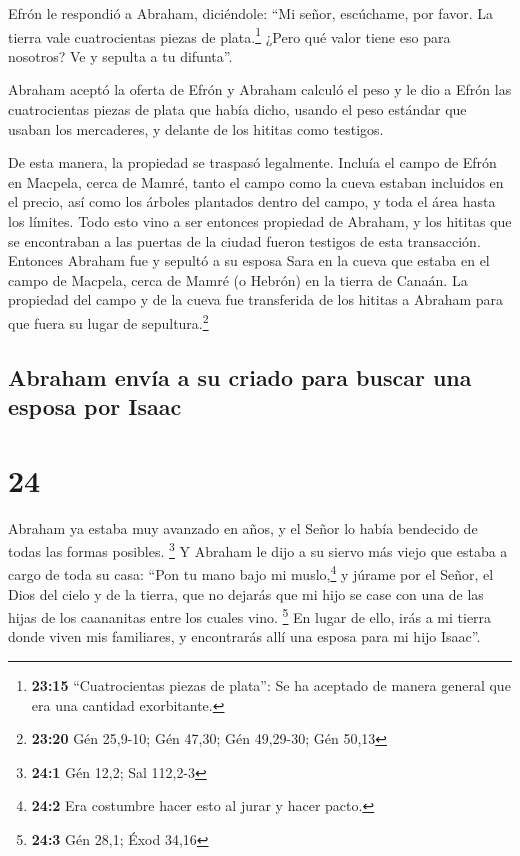  Efrón le respondió a Abraham, diciéndole:
 ``Mi señor, escúchame, por favor. La tierra vale
cuatrocientas piezas de plata.\footnote{\textbf{23:15} ``Cuatrocientas
  piezas de plata'': Se ha aceptado de manera general que era una
  cantidad exorbitante.} ¿Pero qué valor tiene eso para nosotros? Ve y
sepulta a tu difunta''.

 Abraham aceptó la oferta de Efrón y Abraham calculó el
peso y le dio a Efrón las cuatrocientas piezas de plata que había dicho,
usando el peso estándar que usaban los mercaderes, y delante de los
hititas como testigos.

 De esta manera, la propiedad se traspasó legalmente.
Incluía el campo de Efrón en Macpela, cerca de Mamré, tanto el campo
como la cueva estaban incluidos en el precio, así como los árboles
plantados dentro del campo, y toda el área hasta los límites.
 Todo esto vino a ser entonces propiedad de Abraham, y
los hititas que se encontraban a las puertas de la ciudad fueron
testigos de esta transacción.  Entonces Abraham fue y
sepultó a su esposa Sara en la cueva que estaba en el campo de Macpela,
cerca de Mamré (o Hebrón) en la tierra de Canaán.  La
propiedad del campo y de la cueva fue transferida de los hititas a
Abraham para que fuera su lugar de sepultura.\footnote{\textbf{23:20}
  Gén 25,9-10; Gén 47,30; Gén 49,29-30; Gén 50,13}

\hypertarget{abraham-envuxeda-a-su-criado-para-buscar-una-esposa-por-isaac}{%
\subsection{Abraham envía a su criado para buscar una esposa por
Isaac}\label{abraham-envuxeda-a-su-criado-para-buscar-una-esposa-por-isaac}}

\hypertarget{section-23}{%
\section{24}\label{section-23}}

 Abraham ya estaba muy avanzado en años, y el Señor lo
había bendecido de todas las formas posibles. \footnote{\textbf{24:1}
  Gén 12,2; Sal 112,2-3}  Y Abraham le dijo a su siervo
más viejo que estaba a cargo de toda su casa: ``Pon tu mano bajo mi
muslo,\footnote{\textbf{24:2} Era costumbre hacer esto al jurar y hacer
  pacto.}  y júrame por el Señor, el Dios del cielo y de
la tierra, que no dejarás que mi hijo se case con una de las hijas de
los caananitas entre los cuales vino. \footnote{\textbf{24:3} Gén 28,1;
  Éxod 34,16}  En lugar de ello, irás a mi tierra donde
viven mis familiares, y encontrarás allí una esposa para mi hijo
Isaac''.

